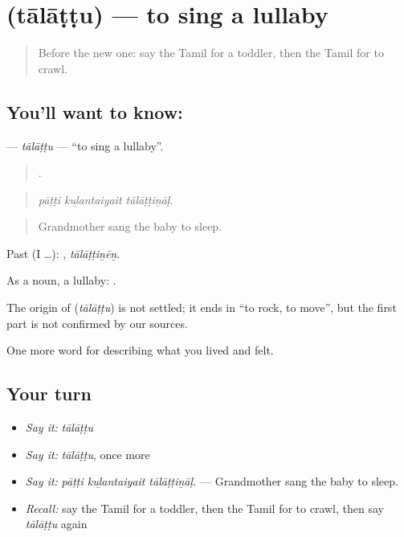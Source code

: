\section[\texorpdfstring{\ta{தாலாட்டு} (tālāṭṭu)}{தாலாட்டு (tālāṭṭu)}]{ (tālāṭṭu) — to sing a lullaby}

\label{lesson:TA-C495-talattu}



\begin{quote}
Before the new one: say the Tamil for a toddler, then the Tamil for to crawl.
\end{quote}

\subsection*{You'll want to know: }
\textbf{} — \emph{tālāṭṭu} — \textquotedblleft{}to sing a lullaby\textquotedblright{}.

\begin{quote}
  .
\end{quote}

\begin{quote}
\emph{pāṭṭi kuḻantaiyait tālāṭṭiṉāḷ.}
\end{quote}

\begin{quote}
Grandmother sang the baby to sleep.
\end{quote}

Past (I …): , \emph{tālāṭṭiṉēṉ}.

As a noun, a lullaby:  .

\begin{cousinweb}
The origin of \textbf{} (\emph{tālāṭṭu}) is not settled; it ends in  \textquotedblleft{}to rock, to move\textquotedblright{}, but the first part is not confirmed by our sources.
\end{cousinweb}

\begin{grammarlens}[title={What you've built}]
One more word for describing what you lived and felt.
\end{grammarlens}

\subsection*{Your turn}
\begin{itemize}
\raggedright
  \item \emph{Say it:} \emph{tālāṭṭu}
  \item \emph{Say it:} \emph{tālāṭṭu}, once more
  \item \emph{Say it:} \emph{pāṭṭi kuḻantaiyait tālāṭṭiṉāḷ.} — Grandmother sang the baby to sleep.
  \item \emph{Recall:} say the Tamil for a toddler, then the Tamil for to crawl, then say \emph{tālāṭṭu} again
\end{itemize}

